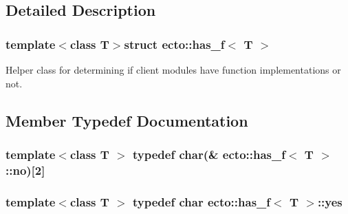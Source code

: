 \subsection{Detailed Description}
\subsubsection*{template$<$class T$>$struct ecto\-::has\-\_\-f$<$ T $>$}

Helper class for determining if client modules have function implementations or not. 

\subsection{Member Typedef Documentation}
\hypertarget{structecto_1_1has__f_ae0c6da775cf20caed616e24681af2807}{
\subsubsection[{no}]{\setlength{\rightskip}{0pt plus 5cm}template$<$class T $>$ typedef char(\& {\bf ecto\-::has\-\_\-f}$<$ T $>$\-::no)\mbox{[}2\mbox{]}}}\label{structecto_1_1has__f_ae0c6da775cf20caed616e24681af2807}
\hypertarget{structecto_1_1has__f_a3fb902f1eed02919195aff1a6b28eb76}{
\subsubsection[{yes}]{\setlength{\rightskip}{0pt plus 5cm}template$<$class T $>$ typedef char {\bf ecto\-::has\-\_\-f}$<$ T $>$\-::{\bf yes}}}\label{structecto_1_1has__f_a3fb902f1eed02919195aff1a6b28eb76}


